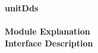 \documentclass[../../../../doc/ASP-SoC_doc/main.tex]{subfiles}
\begin{document}
\textbf{unitDds}
\\\\
\textbf{Module Explanation}
\\
\textbf{Interface Description}
\\
\end{document}
